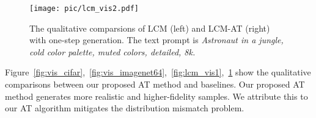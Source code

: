 \begin{figure}[h]
    \centering
\texttt{[image: pic/lcm\_vis2.pdf]}
    \caption{The qualitative comparsions of LCM (left) and LCM-AT (right) with one-step generation. The text prompt is \textit{Astronaut in a jungle, cold color palette, muted colors, detailed, 8k.}}\label{fig:lcm_vis2}
\end{figure}

Figure~\ref{fig:vis_cifar},~\ref{fig:vis_imagenet64},~\ref{fig:lcm_vis1},~\ref{fig:lcm_vis2} show the qualitative comparisons between our proposed AT method and baselines. Our proposed AT method generates more realistic and higher-fidelity samples. We attribute this to our AT algorithm mitigates the distribution mismatch problem.


